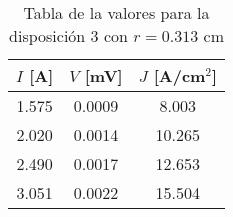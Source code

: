\begin{table}[h!]
    \centering
\begin{tabular}{ccc}
\toprule
$I$ [A] & $V$ [mV] & $J$ [A/cm$^2$] \\
\midrule
1.575 & 0.0009 & 8.003 \\
2.020 & 0.0014 & 10.265 \\
2.490 & 0.0017 & 12.653 \\
3.051 & 0.0022 & 15.504 \\
\bottomrule
\end{tabular}
    \caption{Tabla de la valores para la disposición 3 con $r=0.313$ cm}
    \label{Tab:VIJ_3}
\end{table}
